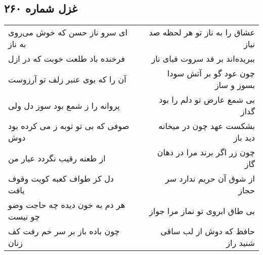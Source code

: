 \begin{center}
\section*{غزل شماره ۲۶۰}
\label{sec:sh260}
\begin{longtable}{l p{0.5cm} r}
ای سرو ناز حسن که خوش می‌روی به ناز
&&
عشاق را به ناز تو هر لحظه صد نیاز
\\
فرخنده باد طلعت خوبت که در ازل
&&
ببریده‌اند بر قد سروت قبای ناز
\\
آن را که بوی عنبر زلف تو آرزوست
&&
چون عود گو بر آتش سودا بسوز و ساز
\\
پروانه را ز شمع بود سوز دل ولی
&&
بی شمع عارض تو دلم را بود گداز
\\
صوفی که بی تو توبه ز می کرده بود دوش
&&
بشکست عهد چون در میخانه دید باز
\\
از طعنه رقیب نگردد عیار من
&&
چون زر اگر برند مرا در دهان گاز
\\
دل کز طواف کعبه کویت وقوف یافت
&&
از شوق آن حریم ندارد سر حجاز
\\
هر دم به خون دیده چه حاجت وضو چو نیست
&&
بی طاق ابروی تو نماز مرا جواز
\\
چون باده باز بر سر خم رفت کف زنان
&&
حافظ که دوش از لب ساقی شنید راز
\\
\end{longtable}
\end{center}
